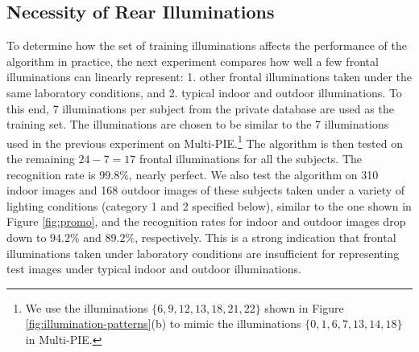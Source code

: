 \subsection{Necessity of Rear Illuminations} To determine how the set of
training illuminations affects the performance of the algorithm in practice,
the next experiment compares how well a few frontal illuminations can linearly
represent: 1. other frontal illuminations taken under the same laboratory
conditions, and 2. typical indoor and outdoor illuminations.  To this end, 7
illuminations per subject from the private database are used as the training
set.  The illuminations are chosen to be similar to the 7 illuminations used in
the previous experiment on Multi-PIE.\footnote{We use the illuminations $\{6,
9, 12, 13, 18, 21, 22\}$ shown in Figure \ref{fig:illumination-patterns}(b) to
mimic the illuminations $\{0, 1, 6, 7, 13, 14, 18\}$ in Multi-PIE.} The
algorithm is then tested on the remaining $24 - 7 = 17$ frontal illuminations
for all the subjects. The recognition rate is $99.8\%$, nearly perfect. We also
test the algorithm on 310 indoor images and 168 outdoor images of these
subjects taken under a variety of lighting conditions (category 1 and 2
specified below), similar to the one shown in Figure \ref{fig:promo}, and the
recognition rates for indoor and outdoor images drop down to $94.2\%$ and
$89.2\%$, respectively. This is a strong indication that frontal illuminations
taken under laboratory conditions are insufficient for representing test images
under typical indoor and outdoor illuminations.

